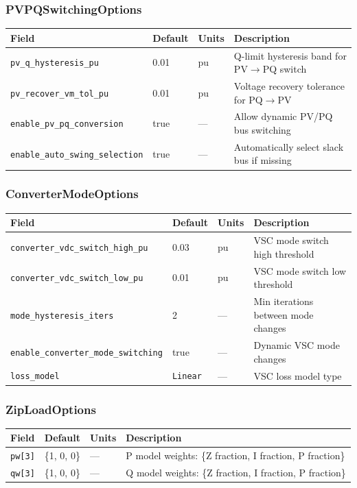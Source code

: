 \subsubsection{PVPQSwitchingOptions}
\begin{center}
\begin{tabular}{llll}
\hline\hline
\textbf{Field} & \textbf{Default} & \textbf{Units} & \textbf{Description} \\
\hline
\texttt{pv\_q\_hysteresis\_pu} & 0.01 & pu & Q-limit hysteresis band for PV$\to$PQ switch \\
\texttt{pv\_recover\_vm\_tol\_pu} & 0.01 & pu & Voltage recovery tolerance for PQ$\to$PV \\
\texttt{enable\_pv\_pq\_conversion} & true & --- & Allow dynamic PV/PQ bus switching \\
\texttt{enable\_auto\_swing\_selection} & true & --- & Automatically select slack bus if missing \\
\hline\hline
\end{tabular}
\end{center}

\subsubsection{ConverterModeOptions}
\begin{center}
\begin{tabular}{llll}
\hline\hline
\textbf{Field} & \textbf{Default} & \textbf{Units} & \textbf{Description} \\
\hline
\texttt{converter\_vdc\_switch\_high\_pu} & 0.03 & pu & VSC mode switch high threshold \\
\texttt{converter\_vdc\_switch\_low\_pu} & 0.01 & pu & VSC mode switch low threshold \\
\texttt{mode\_hysteresis\_iters} & 2 & --- & Min iterations between mode changes \\
\texttt{enable\_converter\_mode\_switching} & true & --- & Dynamic VSC mode changes \\
\texttt{loss\_model} & \texttt{Linear} & --- & VSC loss model type \\
\hline\hline
\end{tabular}
\end{center}

\subsubsection{ZipLoadOptions}
\begin{center}
\begin{tabular}{llll}
\hline\hline
\textbf{Field} & \textbf{Default} & \textbf{Units} & \textbf{Description} \\
\hline
\texttt{pw[3]} & \{1, 0, 0\} & --- & P model weights: \{Z fraction, I fraction, P fraction\} \\
\texttt{qw[3]} & \{1, 0, 0\} & --- & Q model weights: \{Z fraction, I fraction, P fraction\} \\
\hline\hline
\end{tabular}
\end{center}

